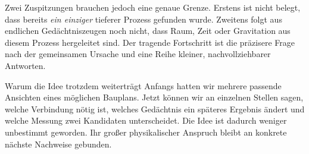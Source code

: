 Zwei Zuspitzungen brauchen jedoch eine genaue Grenze. Erstens ist nicht belegt, dass bereits \emph{ein einziger} tieferer Prozess gefunden wurde. Zweitens folgt aus endlichen Gedächtniszeugen noch nicht, dass Raum, Zeit oder Gravitation aus diesem Prozess hergeleitet sind. Der tragende Fortschritt ist die präzisere Frage nach der gemeinsamen Ursache und eine Reihe kleiner, nachvollziehbarer Antworten.

\begin{bild}{Warum die Idee trotzdem weiterträgt}
Anfangs hatten wir mehrere passende Ansichten eines möglichen Bauplans. Jetzt können wir an einzelnen Stellen sagen, welche Verbindung nötig ist, welches Gedächtnis ein späteres Ergebnis ändert und welche Messung zwei Kandidaten unterscheidet. Die Idee ist dadurch weniger unbestimmt geworden. Ihr großer physikalischer Anspruch bleibt an konkrete nächste Nachweise gebunden.
\end{bild}
